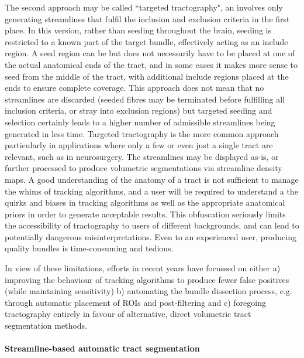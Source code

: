 The second approach may be called ``targeted tractography", an involves only generating streamlines that fulfil the inclusion and exclusion criteria in the first place.
In this version, rather than seeding throughout the brain, seeding is restricted to a known part of the target bundle, effectively acting as an include region.
A seed region can be but does not necessarily have to be placed at one of the actual anatomical ends of the tract, and in some cases it makes more sense to seed from the middle of the tract, with additional include regions placed at the ends to ensure complete coverage.
This approach does not mean that no streamlines are discarded (seeded fibres may be terminated before fulfilling all inclusion criteria, or stray into exclusion regions) but targeted seeding and selection certainly leads to a higher number of admissible streamlines being generated in less time.
Targeted tractography is the more common approach particularly in applications where only a few or even just a single tract are relevant, such as in neurosurgery.
The streamlines may be displayed as-is, or further processed to produce volumetric segmentations via streamline density maps.\autocite{Calamante2010}
A good understanding of the anatomy of a tract is not sufficient to manage the whims of tracking algorithms, and a user will be required to understand a the quirks and biases in tracking algorithms as well as the appropriate anatomical priors in order to generate acceptable results.
This obfuscation seriously limits the accessibility of tractography to users of different backgrounds, and can lead to potentially dangerous misinterpretations. 
Even to an experienced user, producing quality bundles is time-consuming and tedious.

In view of these limitations, efforts in recent years have focussed on either a) improving the behaviour of tracking algorithms to produce fewer false positives (while maintaining sensitivity) b) automating the bundle dissection process, e.g. through automatic placement of ROIs and post-filtering and c) foregoing tractography entirely in favour of alternative, direct volumetric tract segmentation methods.

\paragraph*{Streamline-based automatic tract segmentation}


